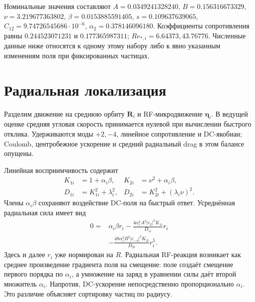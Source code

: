 \documentclass[aip,cha,reprint,a4paper,amsmath,amssymb]{revtex4-2}
\begin{document}
Номинальные значения составляют $A=0.0349241328240$, $B=0.156316673329$, $\nu=3.219677363802$, $\beta=0.0153885591405$, $s=0.109637639065$, $C_{12}=9.74726545686\cdot10^{-6}$, $\alpha_2=0.378146096180$. Коэффициенты сопротивления равны $0.244523071231$ и $0.177365987311$; $Re_{*,i}=6.64373,43.76776$. Численные данные ниже относятся к одному этому набору либо к явно указанным изменениям поля при фиксированных частицах.

\section{Радиальная локализация}
Разделим движение на среднюю орбиту $\mathbf R_i$ и RF-микродвижение $\boldsymbol\eta_i$. В ведущей оценке средняя угловая скорость принимается нулевой при вычислении быстрого отклика. Удерживаются моды $+2,-4$, линейное сопротивление и DC-якобиан; Coulomb, центробежное ускорение и средний радиальный drag в этом балансе опущены.

Линейная восприимчивость содержит
\begin{equation}\begin{aligned}
K_{1i}&=1+\alpha_i\beta,& K_{2i}&=\nu^2+\alpha_i\beta,\\
D_{1i}&=K_{1i}^2+\lambda_i^2,&
D_{2i}&=K_{2i}^2+(\lambda_i\nu)^2.
\end{aligned}\end{equation}
Члены $\alpha_i\beta$ сохраняют воздействие DC-поля на быстрый ответ. Усреднённая радиальная сила имеет вид
\begin{equation}\begin{split}
0={}&\alpha_i\beta r_i
-\frac{4\alpha_i^2A^2|c_2|^2K_{1i}}{D_{1i}}r_i\\
&-\frac{48\alpha_i^2B^2|c_{-4}|^2K_{2i}}{D_{2i}}r_i^5.
\end{split}\label{eq:rad}\end{equation}
Здесь и далее $r_i$ уже нормирован на $R$. Радиальная RF-реакция возникает как среднее произведение градиента поля на смещение: поле создаёт смещение первого порядка по $\alpha_i$, а умножение на заряд в уравнении силы даёт второй множитель $\alpha_i$. Напротив, DC-ускорение непосредственно пропорционально $\alpha_i$. Это различие объясняет сортировку частиц по радиусу.
\end{document}
